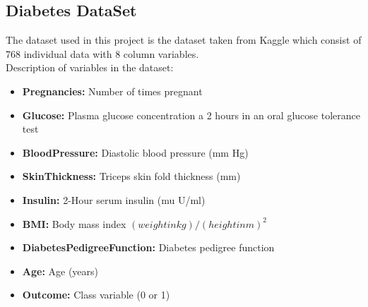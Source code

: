 \documentclass{book}
\begin{document}
	\subsection{Diabetes DataSet}
	The dataset used in this project is the dataset taken from Kaggle which consist of 768 individual data with 8 column variables.\\
	Description of variables in the dataset:
	\begin{itemize}
		\item \textbf{Pregnancies:} Number of times pregnant
		\item \textbf{Glucose:} Plasma glucose concentration a 2 hours in an oral glucose tolerance test
		\item \textbf{BloodPressure:} Diastolic blood pressure (mm Hg)
		\item \textbf{SkinThickness:} Triceps skin fold thickness (mm)
		\item \textbf{Insulin:} 2-Hour serum insulin (mu U/ml)
		\item \textbf{BMI:} Body mass index $(weight in kg)/(height in m)^2$
		\item \textbf{DiabetesPedigreeFunction:} Diabetes pedigree function
		\item \textbf{Age:} Age (years)
		\item \textbf{Outcome:} Class variable (0 or 1)
	\end{itemize}
\end{document}
